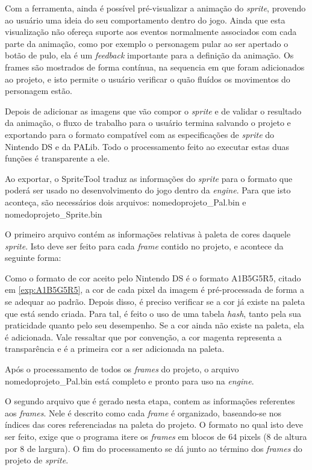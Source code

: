 \documentclass[brazil]{abnt}
\begin{document}
Com a ferramenta, ainda é possível pré-visualizar a animação do \textit{sprite}, provendo ao usuário uma ideia do seu comportamento dentro do jogo. Ainda que esta visualização não ofereça suporte aos eventos normalmente associados com cada parte da animação, como por exemplo o personagem pular ao ser apertado o botão de pulo, ela é um \textit{feedback} importante para a definição da animação. Os frames são mostrados de forma contínua, na sequencia em que foram adicionados ao projeto, e isto permite o usuário verificar o quão fluídos os movimentos do personagem estão.

Depois de adicionar as imagens que vão compor o \textit{sprite} e de validar o resultado da animação, o fluxo de trabalho para o usuário termina salvando o projeto e exportando para o formato compatível com as especificações de \textit{sprite} do Nintendo DS e da PALib. Todo o processamento feito ao executar estas duas funções é transparente a ele. 

Ao exportar, o SpriteTool traduz as informações do \textit{sprite} para o formato que poderá ser usado no desenvolvimento do jogo dentro da \textit{engine}. Para que isto aconteça, são necessários dois arquivos: nomedoprojeto\_Pal.bin e nomedoprojeto\_Sprite.bin

O primeiro arquivo contém as informações relativas à paleta de cores daquele \textit{sprite}. Isto deve ser feito para cada \textit{frame} contido no projeto, e acontece da seguinte forma:

Como o formato de cor aceito pelo Nintendo DS é o formato A1B5G5R5, citado em \ref{exp:A1B5G5R5}, a cor de cada pixel da imagem é pré-processada de forma a se adequar ao padrão. Depois disso, é preciso verificar se a cor já existe na paleta que está sendo criada. Para tal, é feito o uso de uma tabela \textit{hash}, tanto pela sua praticidade quanto pelo seu desempenho. Se a cor ainda não existe na paleta, ela é adicionada. Vale ressaltar que por convenção, a cor magenta representa a transparência e é a primeira cor a ser adicionada na paleta. 

Após o processamento de todos os \textit{frames} do projeto, o arquivo nomedoprojeto\_Pal.bin está completo e pronto para uso na \textit{engine}.

O segundo arquivo que é gerado nesta etapa, contem as informações referentes aos \textit{frames}. Nele é descrito como cada \textit{frame} é organizado, baseando-se nos índices das cores referenciadas na paleta do projeto. O formato no qual isto deve ser feito, exige que o programa itere os \textit{frames} em blocos de 64 pixels (8 de altura por 8 de largura). O fim do processamento se dá junto ao término dos \textit{frames} do projeto de \textit{sprite}. 
\end{document}
